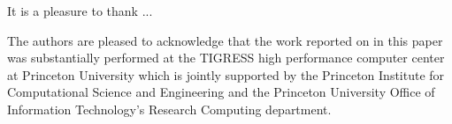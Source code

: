 \documentclass[modern, letterpaper]{aastex62}
\newcommand{\apogee}{\project{\acronym{APOGEE}}}
\newcommand{\sdssiv}{\project{\acronym{SDSS-IV}}}
\begin{document}
It is a pleasure to thank ...

The authors are pleased to acknowledge that the work reported on in this
paper was substantially performed at the TIGRESS high performance computer
center at Princeton University which is jointly supported by the Princeton
Institute for Computational Science and Engineering and the Princeton
University Office of Information Technology's Research Computing department.


\facility{\sdssiv, \apogee}

\clearpage



\end{document}
